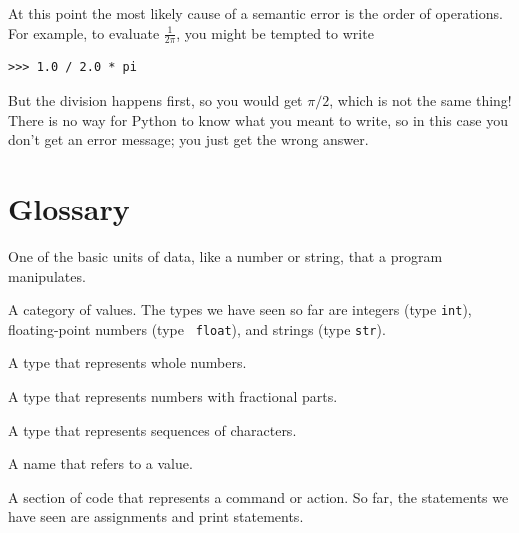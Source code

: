 
At this point the most likely cause of a semantic error is
the order of operations.  For example, to evaluate $\frac{1}{2 \pi}$,
you might be tempted to write

\beforeverb
\begin{verbatim}
>>> 1.0 / 2.0 * pi
\end{verbatim}
\afterverb
%
But the division happens first, so you would get $\pi / 2$, which
is not the same thing!  There is no way for Python
to know what you meant to write, so in this case you don't
get an error message; you just get the wrong answer.



\section{Glossary}

\begin{vocabulary}[value:]  One of the basic units of data, like a number or string, 
that a program manipulates.
\end{vocabulary}
	
\begin{vocabulary}[type:] A category of values.  The types we have seen so far
are integers (type {\tt int}), floating-point numbers (type {\tt
float}), and strings (type {\tt str}).
\end{vocabulary}
	
\begin{vocabulary}[integer:] A type that represents whole numbers.
\end{vocabulary}
	
\begin{vocabulary} A type that represents numbers with fractional
parts.
\end{vocabulary}
	
\begin{vocabulary}[string:] A type that represents sequences of characters.
\end{vocabulary}
	
\begin{vocabulary}[variable:]  A name that refers to a value.
\end{vocabulary}
	
\begin{vocabulary}[statement:]  A section of code that represents a command or action.  So
far, the statements we have seen are assignments and print statements.
\end{vocabulary}
	
